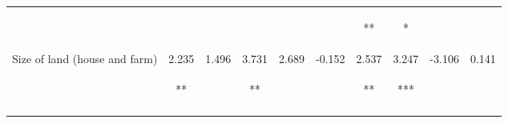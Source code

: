 \begin{tabular}{lccccccccc}
 & \begin{footnotesize}[0.031]\end{footnotesize} & \begin{footnotesize}[0.054]\end{footnotesize} & \begin{footnotesize}[0.046]\end{footnotesize} & \begin{footnotesize}[0.050]\end{footnotesize} & \begin{footnotesize}[0.054]\end{footnotesize} & \begin{footnotesize}[0.029]**\end{footnotesize} & \begin{footnotesize}[0.028]*\end{footnotesize} & \begin{footnotesize}[0.064]\end{footnotesize} & \begin{footnotesize}[0.060]\end{footnotesize}\\
\noalign{\smallskip}Size of land (house and farm) & 2.235 & 1.496 & 3.731 & 2.689 & -0.152 & 2.537 & 3.247 & -3.106 & 0.141\\
 & \begin{footnotesize}[1.137]**\end{footnotesize} & \begin{footnotesize}[1.956]\end{footnotesize} & \begin{footnotesize}[1.653]**\end{footnotesize} & \begin{footnotesize}[2.082]\end{footnotesize} & \begin{footnotesize}[2.303]\end{footnotesize} & \begin{footnotesize}[1.057]**\end{footnotesize} & \begin{footnotesize}[1.034]***\end{footnotesize} & \begin{footnotesize}[2.513]\end{footnotesize} & \begin{footnotesize}[2.327]\end{footnotesize}\\
\noalign{\smallskip}\hline\end{tabular}
